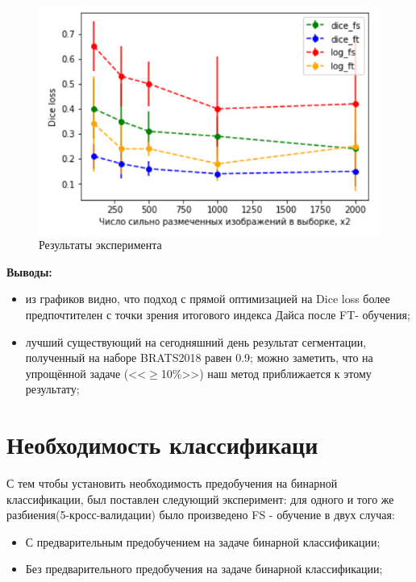 \begin{figure}[h!] 
  \center
  \includegraphics [scale=1.2] {images/plot_results.png}
  \caption{ Результаты эксперимента} 
\end{figure}

{\bf Выводы:} 

\begin{itemize}
    \item из графиков видно, что подход с прямой оптимизацией на Dice loss более предпочтителен с точки зрения итогового индекса Дайса после FT- обучения;
    \item лучший существующий на сегодняшний день результат сегментации, полученный на наборе BRATS2018 равен 0.9\cite{BRATS_winning_2018}; можно заметить, что на упрощённой задаче (<<$\ge$10\%>>) наш метод приближается к этому результату; 
\end{itemize}

\section{Необходимость классификаци}

С тем чтобы установить необходимость предобучения на бинарной классификации, был поставлен следующий эксперимент: для одного и того же разбиения(5-кросс-валидации) было произведено FS - обучение в двух случая:
\begin{itemize}
    \item С предварительным предобучением на задаче бинарной классификации;
    \item Без предварительного предобучения на задаче бинарной классификации;
\end{itemize}



